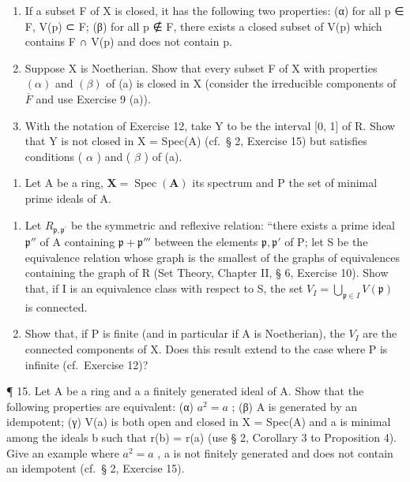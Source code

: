 \begin{enumerate}
\def\labelenumi{(\alph{enumi})}
\item
  If a subset F of X is closed, it has the following two properties: (α) for all p ∈ F, V(p) ⊂ F; (β) for all p ∉ F, there exists a closed subset of V(p) which contains F ∩ V(p) and does not contain p.
\item
  Suppose X is Noetherian. Show that every subset F of X with properties \((\alpha)\) and \((\beta)\) of (a) is closed in X (consider the irreducible components of \(\overline{F}\) and use Exercise 9 (a)).
\item
  With the notation of Exercise 12, take Y to be the interval {[}0, 1{]} of R. Show that Y is not closed in X = Spec(A) (cf.~§ 2, Exercise 15) but satisfies conditions ( \(\alpha\) ) and ( \(\beta\) ) of (a).
\end{enumerate}

\begin{enumerate}
\def\labelenumi{\arabic{enumi}.}
\setcounter{enumi}{13}
\tightlist
\item
  Let A be a ring, \(\mathbf{X} = \operatorname{Spec}(\mathbf{A})\) its spectrum and P the set of minimal prime ideals of A.
\end{enumerate}

\begin{enumerate}
\def\labelenumi{(\alph{enumi})}
\item
  Let \(R_{\mathfrak{p},\mathfrak{p}^{\prime}}\) be the symmetric and reflexive relation: ``there exists a prime ideal \(\mathfrak{p}''\) of A containing \(\mathfrak{p} + \mathfrak{p}'''\) between the elements \(\mathfrak{p},\mathfrak{p}'\) of P; let S be the equivalence relation whose graph is the smallest of the graphs of equivalences containing the graph of R (Set Theory, Chapter II, § 6, Exercise 10). Show that, if I is an equivalence class with respect to S, the set \(V_{I} = \bigcup_{\mathfrak{p}\in I}V(\mathfrak{p})\) is connected.
\item
  Show that, if P is finite (and in particular if A is Noetherian), the \(V_{I}\) are the connected components of X. Does this result extend to the case where P is infinite (cf.~Exercise 12)?
\end{enumerate}

¶ 15. Let A be a ring and a a finitely generated ideal of A. Show that the following properties are equivalent: (α) \(a^{2} = a\) ; (β) A is generated by an idempotent; (γ) V(a) is both open and closed in X = Spec(A) and a is minimal among the ideals b such that r(b) = r(a) (use § 2, Corollary 3 to Proposition 4). Give an example where \(a^{2} = a\) , a is not finitely generated and does not contain an idempotent (cf.~§ 2, Exercise 15).


